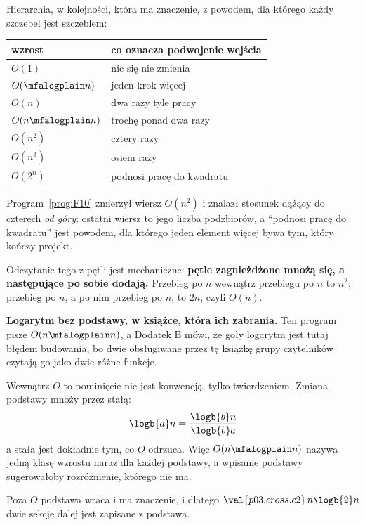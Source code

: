 \begin{fr}
Hierarchia, w kolejności, która ma znaczenie, z powodem, dla którego każdy
szczebel jest szczeblem:

\begin{center}
\begin{tabular}{ll}
\toprule
wzrost & co oznacza podwojenie wejścia \\
\midrule
$O(1)$ & nic się nie zmienia \\
$O(\mfalogplain n)$ & jeden krok więcej \\
$O(n)$ & dwa razy tyle pracy \\
$O(n \mfalogplain n)$ & trochę ponad dwa razy \\
$O(n^{2})$ & cztery razy \\
$O(n^{3})$ & osiem razy \\
$O(2^{n})$ & podnosi pracę do kwadratu \\
\bottomrule
\end{tabular}
\end{center}

Program~\ref{prog:F10} zmierzył wiersz $O(n^{2})$ i znalazł stosunek dążący do
czterech \emph{od góry}; ostatni wiersz to jego liczba podzbiorów, a
\enquote{podnosi pracę do kwadratu} jest powodem, dla którego jeden element
więcej bywa tym, który kończy projekt.

Odczytanie tego z pętli jest mechaniczne: \textbf{pętle zagnieżdżone mnożą się,
a następujące po sobie dodają.} Przebieg po $n$ wewnątrz przebiegu po $n$ to
$n^{2}$; przebieg po $n$, a po nim przebieg po $n$, to $2n$, czyli $O(n)$.

\begin{notationbox}
\textbf{Logarytm bez podstawy, w książce, która ich zabrania.} Ten program
pisze $O(n \mfalogplain n)$, a Dodatek B mówi, że goły logarytm jest tutaj
błędem budowania, bo dwie obsługiwane przez tę książkę grupy czytelników
czytają go jako dwie różne funkcje.

Wewnątrz $O$ to pominięcie nie jest konwencją, tylko twierdzeniem. Zmiana
podstawy mnoży przez stałą:
\[ \logb{a} n = \frac{\logb{b} n}{\logb{b} a} \]
a stała jest dokładnie tym, co $O$ odrzuca. Więc $O(n \mfalogplain n)$ nazywa
jedną klasę wzrostu naraz dla każdej podstawy, a wpisanie podstawy sugerowałoby
rozróżnienie, którego nie ma.

Poza $O$ podstawa wraca i ma znaczenie, i dlatego
$\val{p03.cross.c2}\,n\logb{2}n$ dwie sekcje dalej jest zapisane z podstawą.
\end{notationbox}
\end{fr}

